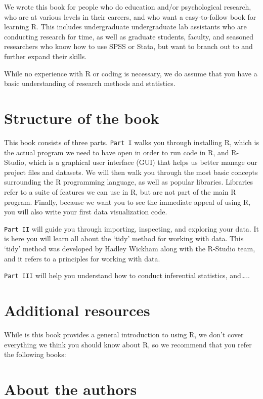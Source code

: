 \documentclass[
]{book}
\begin{document}
We wrote this book for people who do education and/or psychological research, who are at various levels in their careers, and who want a easy-to-follow book for learning R. This includes undergraduate undergraduate lab assistants who are conducting research for time, as well as graduate students, faculty, and seasoned researchers who know how to use SPSS or Stata, but want to branch out to and further expand their skills.

While no experience with R or coding is necessary, we do assume that you have a basic understanding of research methods and statistics.

\hypertarget{structure-of-the-book}{%
\section{Structure of the book}\label{structure-of-the-book}}

This book consists of three parts. \texttt{Part\ I} walks you through installing R, which is the actual program we need to have open in order to run code in R, and R-Studio, which is a graphical user interface (GUI) that helps us better manage our project files and datasets. We will then walk you through the most basic concepts surrounding the R programming language, as well as popular libraries. Libraries refer to a suite of features we can use in R, but are not part of the main R program. Finally, because we want you to see the immediate appeal of using R, you will also write your first data visualization code.

\texttt{Part\ II} will guide you through importing, inspecting, and exploring your data. It is here you will learn all about the `tidy' method for working with data. This `tidy' method was developed by Hadley Wickham along with the R-Studio team, and it refers to a principles for working with data.

\texttt{Part\ III} will help you understand how to conduct inferential statistics, and\ldots..

\hypertarget{additional-resources}{%
\section{Additional resources}\label{additional-resources}}

While is this book provides a general introduction to using R, we don't cover everything we think you should know about R, so we recommend that you refer the following books:

\hypertarget{about-the-authors}{%
\section{About the authors}\label{about-the-authors}}
\end{document}
